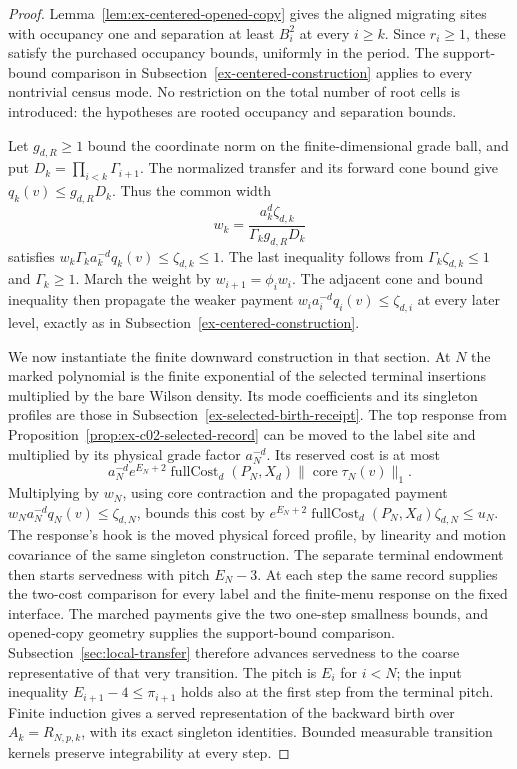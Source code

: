 \begin{proof}
Lemma~\ref{lem:ex-centered-opened-copy} gives the aligned migrating
sites with occupancy one and separation at least $B_i^2$ at every
$i\ge k$. Since $r_i\ge1$, these satisfy the purchased occupancy
bounds, uniformly in the period. The support-bound comparison in
Subsection~\ref{ex-centered-construction} applies to every nontrivial
census mode. No restriction on the total number of root cells is
introduced: the hypotheses are rooted occupancy and separation bounds.

Let $g_{d,R}\ge1$ bound the coordinate norm on the finite-dimensional
grade ball, and put $D_k=\prod_{i<k}\Gamma_{i+1}$. The normalized
transfer and its forward cone bound give $q_k(v)\le g_{d,R}D_k$.
Thus the common width
\[
 w_k=\frac{a_k^d\zeta_{d,k}}{\Gamma_k g_{d,R}D_k}
\]
satisfies $w_k\Gamma_k a_k^{-d}q_k(v)\le\zeta_{d,k}\le1$.
The last inequality follows from $\Gamma_k\zeta_{d,k}\le1$ and
$\Gamma_k\ge1$. March the weight by $w_{i+1}=\phi_iw_i$.
The adjacent cone and bound inequality then propagate the weaker
payment $w_i a_i^{-d}q_i(v)\le\zeta_{d,i}$ at every later level,
exactly as in Subsection~\ref{ex-centered-construction}.

We now instantiate the finite downward construction in that section.
At $N$ the marked polynomial is the finite exponential of the selected
terminal insertions multiplied by the bare Wilson density. Its mode
coefficients and its singleton profiles are those in
Subsection~\ref{ex-selected-birth-receipt}. The top response from
Proposition~\ref{prop:ex-c02-selected-record} can be moved to the
label site and multiplied by its physical grade factor $a_N^{-d}$.
Its reserved cost is at most
\[
 a_N^{-d}e^{E_N+2}\operatorname{fullCost}_d(P_N,X_d)
       \|\operatorname{core}\tau_N(v)\|_1.
\]
Multiplying by $w_N$, using core contraction and the propagated
payment $w_Na_N^{-d}q_N(v)\le\zeta_{d,N}$, bounds this cost by
$e^{E_N+2}\operatorname{fullCost}_d(P_N,X_d)\zeta_{d,N}\le u_N$.
The response's hook is the moved physical forced profile, by
linearity and motion covariance of the same singleton construction.
The separate terminal endowment then starts servedness with pitch
$E_N-3$. At each step the same record supplies the two-cost comparison
for every label and the finite-menu response on the fixed interface.
The marched payments give the two one-step smallness bounds, and
opened-copy geometry supplies the support-bound comparison.
Subsection~\ref{sec:local-transfer} therefore advances servedness to the
coarse representative of that very transition. The pitch is $E_i$
for $i<N$; the input inequality $E_{i+1}-4\le\pi_{i+1}$ holds also
at the first step from the terminal pitch. Finite induction gives a
served representation of the backward birth over $A_k=R_{N,p,k}$,
with its exact singleton identities. Bounded measurable transition
kernels preserve integrability at every step.


\end{proof}
